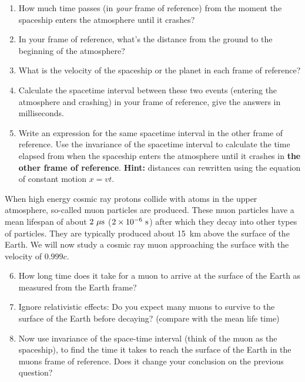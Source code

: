 {\begin{multicols}{2}
\begin{enumerate}
\item How much time passes (in \textit{your} frame of reference) from the moment the spaceship enters the atmosphere until it crashes?
\item In your frame of reference, what's the distance from the ground to the beginning of the atmosphere?
\item What is the velocity of the spaceship or the planet in each frame of reference?
\item Calculate the spacetime interval between these two events (entering the atmosphere and crashing) in your frame of reference, give the answers in milliseconds.
\item Write an expression for the same spacetime interval in the other frame of reference. Use the invariance of the spacetime interval to calculate the time elapsed from when the spaceship enters the atmosphere until it crashes in {\bf the other frame of reference}. {\bf Hint:} distances can rewritten using the equation of constant motion $x=vt$.
\end{enumerate}
When high energy cosmic ray protons collide with atoms in the upper atmosphere, so-called muon particles are produced. These muon particles have a mean lifespan of about $2 {\rm \ \mu s}$ ($2\times10^{-6} {\rm \ s}$) after which they decay into other types of particles. They are typically produced about 15~km above the surface of the Earth. We will now study a cosmic ray muon approaching the surface with the velocity of $0.999c$.
\begin{enumerate}
\setcounter{enumi}{5}
\item How long time does it take for a muon to arrive at the surface of the Earth as measured from the Earth frame?
\item Ignore relativistic effects: Do you expect many muons to survive to the surface of the Earth before decaying? (compare with the mean life time)
\item Now use invariance of the space-time interval (think of the muon as the spaceship), to find the time it takes to reach the surface of the Earth in the muons frame of reference. Does it change your conclusion on the previous question?
\end{enumerate}

\vspace{0.5cm}



\end{multicols}}
